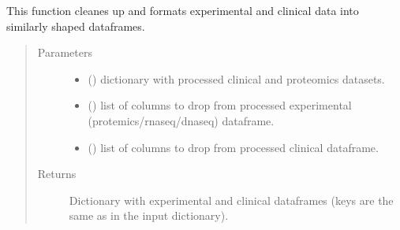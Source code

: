 \documentclass[letterpaper,10pt,english]{sphinxmanual}
\begin{document}
\begin{fulllineitems}
\label{\detokenize{_autosummary/analytics_core.analytics:analytics_core.analytics.wgcnaAnalysis.get_data}}
This function cleanes up and formats experimental and clinical data into similarly shaped dataframes.
\begin{quote}\begin{description}
\item[{Parameters}] \leavevmode\begin{itemize}
\item {} 
 () \textendash{} dictionary with processed clinical and proteomics datasets.

\item {} 
 () \textendash{} list of columns to drop from processed experimental (protemics/rna\sphinxhyphen{}seq/dna\sphinxhyphen{}seq) dataframe.

\item {} 
 () \textendash{} list of columns to drop from processed clinical dataframe.

\end{itemize}

\item[{Returns}] \leavevmode
Dictionary with experimental and clinical dataframes (keys are the same as in the input dictionary).

\end{description}\end{quote}

\end{fulllineitems}
\end{document}
